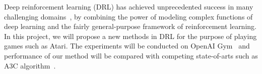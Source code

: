 Deep reinforcement learning (DRL) has achieved
unprecedented success in many challenging
domains~\cite{mnih2015human,silver2016mastering}, by combining the power of modeling complex
functions of deep learning and the fairly general-purpose framework of reinforcement learning.
In this project, we will propose a new methods in DRL for the purpose of playing games such as Atari.
The experiments will be conducted on OpenAI Gym~\cite{brockman2016openai} and performance of our method will be compared with
competing state-of-arts such as A3C algorithm~\cite{mnih2016asynchronous}. 